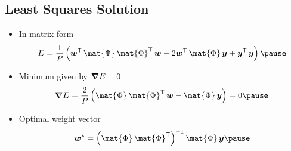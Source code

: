 \begin{slide}
\section{Least Squares Solution}

\begin{PauseHighLight}

\begin{itemize}
\item In matrix form
  \begin{displaymath}
    E = \frac{1}{P} \left( \strut \bm{w}^\tr \, \mat{\Phi} \,
    \mat{\Phi}^\tr \, \bm{w} - 2 \bm{w}^\tr \, \mat{\Phi} \, \bm{y} +
    \bm{y}^\tr \, \bm{y} \right)\pause
  \end{displaymath}
\item Minimum given by $\bm{\nabla} E=0$
  \begin{displaymath}
    \grad E = \frac{2}{P} \left( \strut \mat{\Phi} \,
    \mat{\Phi}^\tr\, \bm{w} - \mat{\Phi} \, \bm{y} \right)=0\pause
  \end{displaymath}
\item Optimal weight vector
  \begin{displaymath}
    \bm{w}^* = \left( \mat{\Phi} \, \mat{\Phi}^\tr \right)^{-1}
    \mat{\Phi} \, \bm{y} \pause
  \end{displaymath}
\end{itemize}

\end{PauseHighLight}
\end{slide}


